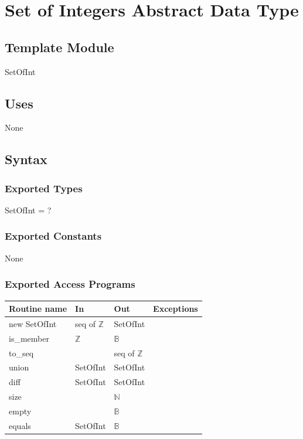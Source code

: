 \documentclass[12pt,fleqn]{examtst}
\begin{document}

\newpage

\section* {Set of Integers Abstract Data Type}

\subsection* {Template Module}

SetOfInt

\subsection* {Uses}

None

\subsection* {Syntax}

\subsubsection* {Exported Types}

SetOfInt = ?

\subsubsection* {Exported Constants}

None

\subsubsection* {Exported Access Programs}

\begin{tabular}{| l | l | l | p{6cm} |}
\hline
\textbf{Routine name} & \textbf{In} & \textbf{Out} & \textbf{Exceptions}\\
\hline
new SetOfInt & seq of $\mathbb{Z}$ & SetOfInt & \\
\hline
is\_member & $\mathbb{Z}$ & $\mathbb{B}$ & \\
\hline
to\_seq &  & seq of $\mathbb{Z}$ & \\
\hline
union & SetOfInt & SetOfInt & \\
\hline
diff & SetOfInt & SetOfInt & \\
\hline
size &  & $\mathbb{N}$ & \\
\hline
empty &  & $\mathbb{B}$ & \\
\hline
equals & SetOfInt & $\mathbb{B}$ & \\
\hline

\end{tabular}
\end{document}
